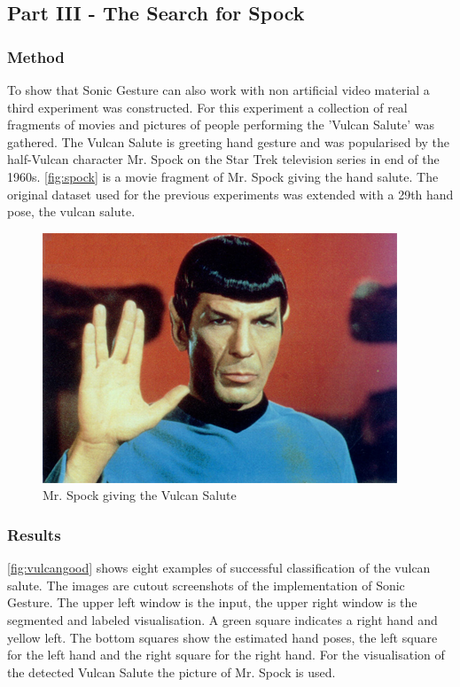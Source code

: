 \subsection{Part III - The Search for Spock}

\subsubsection{Method}
To show that Sonic Gesture can also work with non artificial video material a third experiment was constructed. For this experiment a collection of real fragments of movies and pictures of people performing the 'Vulcan Salute' was gathered. The Vulcan Salute is greeting hand gesture and was popularised by the half-Vulcan character Mr. Spock on the Star Trek television series in end of the 1960s. \autoref{fig:spock} is a movie fragment of Mr. Spock giving the hand salute. The original dataset used for the previous experiments was extended with a 29th hand pose, the vulcan salute. 

\begin{figure}[htbp]
\centering{}
\includegraphics[width=0.6\linewidth]{figures/spock/salute.png}
\caption{Mr. Spock giving the Vulcan Salute}
\label{fig:spock}
\end{figure}


\subsubsection{Results}
\autoref{fig:vulcangood} shows eight examples of successful classification of the vulcan salute. The images are cutout screenshots of the implementation of Sonic Gesture. The upper left window is the input, the upper right window is the segmented and labeled visualisation. A green square indicates a right hand and yellow left. The bottom squares show the estimated hand poses, the left square for the left hand and the right square for the right hand. For the visualisation of the detected Vulcan Salute the picture of Mr. Spock is used.

